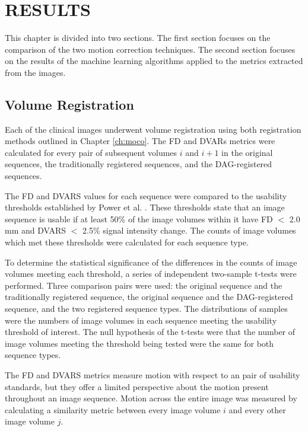 \chapter{RESULTS}
\label{ch:results}

This chapter is divided into two sections. The first section focuses on the comparison of the two motion correction techniques. The second section focuses on the results of the machine learning algorithms applied to the metrics extracted from the images.

\section{Volume Registration} 

Each of the clinical images underwent volume registration using both registration methods outlined in Chapter \ref{ch:moco}. The FD and DVARs metrics were calculated for every pair of subsequent volumes $i$ and $i+1$ in the original sequences, the traditionally registered sequences, and the DAG-registered sequences. 

The FD and DVARS values for each sequence were compared to the usability thresholds established by Power et al. \cite{Power2012}. These thresholds state that an image sequence is usable if at least 50\% of the image volumes within it have FD $<$ 2.0 mm and DVARS $<$ 2.5\% signal intensity change. The counts of image volumes which met these thresholds were calculated for each sequence type.

To determine the statistical significance of the differences in the counts of image volumes meeting each threshold, a series of independent two-sample t-tests were performed. Three comparison pairs were used: the original sequence and the traditionally registered sequence, the original sequence and the DAG-registered sequence, and the two registered sequence types. The distributions of samples were the numbers of image volumes in each sequence meeting the usability threshold of interest. The null hypothesis of the t-tests were that the number of image volumes meeting the threshold being tested were the same for both sequence types.

The FD and DVARS metrics measure motion with respect to an pair of usability standards, but they offer a limited perspective about the motion present throughout an image sequence. Motion across the entire image was measured by calculating a similarity metric between every image volume $i$ and every other image volume $j$. 

